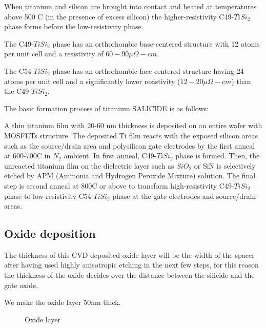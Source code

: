 When titanium and silicon are brought into contact and heated at temperatures above 500 \degree C (in the presence of excess silicon) the higher-resistivity C49-$TiSi_2$ phase forms before the low-resistivity phase.

The C49-$TiSi_2$ phase has an orthorhombic base-centered structure with 12 atoms per unit cell and a resistivity of $60-90 \mu\Omega - cm$.

The C54-$TiSi_2$ phase has an orthorhombic face-centered structure having 24 atoms per unit cell and a significantly lower resistivity ($12-20 \mu\Omega - cm$) than the C49-$TiSi_2$.

The basic formation process of titanium SALICIDE is as follows:

A thin titanium film with 20-60 nm thickness is deposited on an entire wafer with MOSFETs structure.
The deposited Ti film reacts with the exposed silicon areas such as the source/drain area and polysilicon gate electrodes by the first anneal at 600-700\degree C in $N_2$ ambient. In first anneal, C49-$TiSi_2$ phase is formed.
Then, the unreacted titanium film on the dielectric layer such as $SiO_2$ or SiN is selectively etched by APM (Ammonia and Hydrogen Peroxide Mixture) solution.
The final step is second anneal at 800\degree C or above to transform high-resistivity C49-$TiSi_2$ phase to low-resistivity C54-$TiSi_2$ phase at the gate electrodes and source/drain areas.

\newpage

\subsection{Oxide deposition}

The thickness of this CVD deposited oxide layer will be the width of the spacer after having used highly anisotropic etching in the next few steps, for this reason the thickness of the oxide decides over the distance between the silicide and the gate oxide.

We make the oxide layer 50nm thick.

\begin{figure}[H]
	\centering
	\begin{tikzpicture}[node distance = 3cm, auto, thick,scale=\CrossSectionOnly, every node/.style={transform shape}]
		
	\end{tikzpicture}
	\begin{tikzpicture}[node distance = 3cm, auto, thick,scale=\CrossSectionOnly, every node/.style={transform shape}]
		
	\end{tikzpicture}
	\caption{Oxide layer}
\end{figure}

